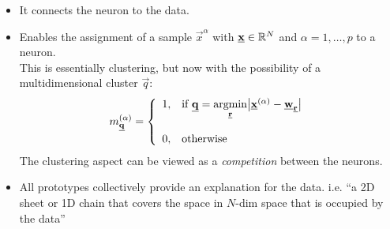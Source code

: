 \begin{frame}%


\pause

\begin{itemize}
\item It connects the neuron to the data.
\item Enables the assignment of a sample $\vec x^{\alpha}$ with $\underline{\mathbf{x}} \in \mathbb{R}^N$ and $\alpha = 1,\ldots,p$ to a neuron.\\
This is essentially clustering, but now with the possibility of a multidimensional cluster $\vec q$: \\
\begin{equation}
	m_{\vec{q}}^{(\alpha)} = \left\{ \begin{array}{ll}
		1, & \text{if } \vec q = \underset{\vec r}{\argmin} \big| \vec{x}^{(\alpha)}
			-\vec{w}_{\vec r} \big| \\\\
		0, & \text{otherwise}
	\end{array} \right.
\end{equation}
The clustering aspect can be viewed as a \emph{competition} between the neurons.
\item All prototypes collectively provide an explanation for the data. i.e. ``a 2D sheet or 1D chain that covers the space in $N$-dim space that is occupied by the data''
\end{itemize}

\end{frame}




